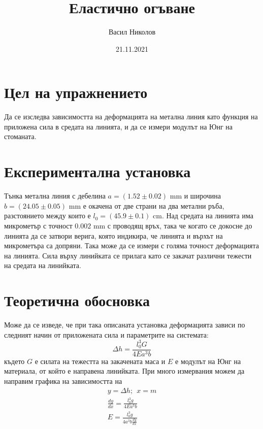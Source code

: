 \documentclass[aps, prb, twocolumn, a4paper, floatfix, reprint]{revtex4-2}
\begin{document}
\title{Еластично огъване}
\author{Васил Николов}
\noaffiliation
\date{21.11.2021}
\maketitle

\section{Цел на упражнението}
Да се изследва зависимостта на деформацията на метална линия като функция на приложена сила в средата на линията, и да се измери модулът на Юнг на стоманата.


\section{Експериментална установка}
Тънка метална линия с дебелина $a=(1.52 \pm 0.02)$ mm и широчина $b=(24.05 \pm 0.05)$ mm е окачена от две страни на два метални ръба, разстоянието между които е $l_0 = (45.9 \pm 0.1)$ cm. Над средата на линията има микрометър с точност $0.002$ mm с проводящ връх, така че когато се докосне до линията да се затвори верига, която индикира, че линията и върхът на микрометъра са допряни. Така може да се измери с голяма точност деформацията на линията. Сила върху линийката се прилага като се закачат различни тежести на средата на линийката.

\section{Теоретична обосновка}
Може да се изведе, че при така описаната установка деформацията зависи по следният начин от приложената сила и параметрите на системата:
\begin{equation} \label{eq:1}
    \Delta h=\frac{l_0^3 G}{4E a^3 b}
\end{equation}
където $G$ е силата на тежестта на закачената маса и $E$ е модулът на Юнг на материала, от който е направена линийката. При много измервания можем да направим графика на зависимостта на 
\begin{gather*} \label{eq:2}
    y=\Delta h; \ \ x = m \\
    \frac{dy}{dx} = \frac{l_0^3 g}{4E a^3 b} \\
    E = \frac{l_0^3 g}{4a^3 b \frac{dy}{dx}} \tag{2}
\end{gather*}
\end{document}
